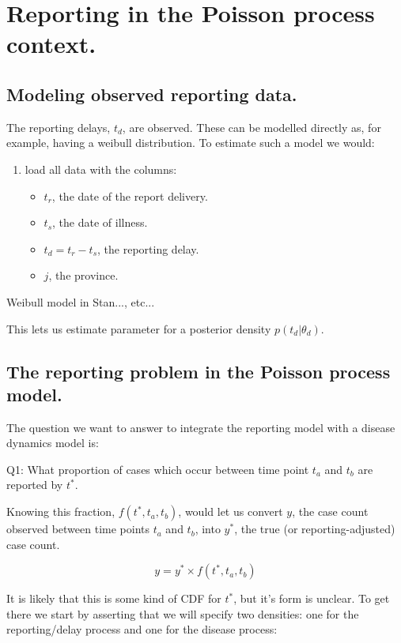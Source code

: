 \chapter{Reporting in the Poisson process context.}

\section{Modeling observed reporting data.}

The reporting delays, $t_d$, are observed.  These can be modelled
directly as, for example, having a weibull distribution.  To estimate
such a model we would:

\begin{enumerate}
\item load all data with the columns: \begin{itemize}
	\item $t_r$, the date of the report delivery.
	\item $t_s$, the date of illness.
	\item $t_d=t_r - t_s$, the reporting delay.
	\item $j$, the province.
	\end{itemize}
\end{enumerate}

Weibull model in Stan..., etc...

This lets us estimate parameter for a posterior density
$p(t_d|\theta_d)$.  

\section{The reporting problem in the Poisson process model.} 

The question we want to answer to integrate the reporting model with a
disease dynamics model is: 

Q1: What proportion of cases which occur between time point $t_a$ and
$t_b$ are reported by $t^*$.

Knowing this fraction, $f(t^*, t_a, t_b)$, would let us convert $y$, the
case count observed between time points $t_a$ and $t_b$, into $y^*$, the true (or reporting-adjusted) case
count.  

\begin{equation}
y = y^* \times f(t^*, t_a, t_b)
\end{equation}

It is likely that this is some kind of CDF for $t^*$, but it's
form is unclear. To get there we start by asserting that we will specify
two densities: one for the reporting/delay process and one for the
disease process:

